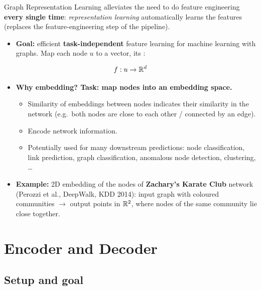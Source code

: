 \begin{keyidea}
  Graph Representation Learning alleviates the need to do feature engineering
  \textbf{every single time}: \emph{representation learning} automatically
  learns the features (replaces the feature-engineering step of the pipeline).
\end{keyidea}
\begin{itemize}
  \item \textbf{Goal:} efficient \textbf{task-independent} feature learning for
    machine learning with graphs. Map each node $u$ to a vector, its
    :
\end{itemize}
\begin{equation}\label{eq:lec02-f}
  f: u\to\mathbb{R}^d
\end{equation}
\begin{itemize}
  \item \textbf{Why embedding? Task: map nodes into an embedding space.}
    \begin{itemize}
      \item Similarity of embeddings between nodes indicates their similarity in
        the network (e.g.\ both nodes are close to each other / connected by an edge).
      \item Encode network information.
      \item Potentially used for many downstream predictions: node
        classification, link prediction, graph classification, anomalous node
        detection, clustering, \ldots
    \end{itemize}
  \item \textbf{Example:} 2D embedding of the nodes of \textbf{Zachary's Karate
    Club} network (Perozzi et al., DeepWalk, KDD 2014): input graph with
    coloured communities $\to$ output points in $\mathbb{R}^2$, where nodes of the same
    community lie close together.
\end{itemize}

\section{Encoder and Decoder}\label{sec:lec02-encdec}

\subsection{Setup and goal}\label{sec:lec02-setup}

